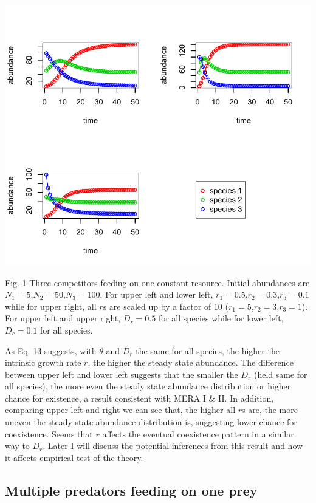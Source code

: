 \documentclass[12pt]{article}
\begin{document}
\includegraphics[width=\textwidth]{integrated_multi_competitors.pdf}
\begin{center}
Fig. 1 Three competitors feeding on one constant resource. Initial abundances are $N_1=5$,$N_2=50$,$N_3=100$. For upper left and lower left, $r_1=0.5$,$r_2=0.3$,$r_3=0.1$ while for upper right, all $r$s are scaled up by a factor of 10 ($r_1=5$,$r_2=3$,$r_3=1$). For upper left and upper right, $D_r=0.5$ for all species while for lower left, $D_r=0.1$ for all species.
\end{center}

As Eq. 13 suggests, with $\theta$ and $D_r$ the same for all species, the higher the intrinsic growth rate $r$, the higher the steady state abundance. The difference between upper left and lower left suggests that the smaller the $D_r$ (held same for all species), the more even the steady state abundance distribution or higher chance for existence, a result consistent with MERA I \& II. In addition, comparing upper left and right we can see that, the higher all $r$s are, the more uneven the steady state abundance distribution is, suggesting lower chance for coexistence. Seems that $r$ affects the eventual coexistence pattern in a similar way to $D_r$. Later I will discuss the potential inferences  from this result and how it affects empirical test of the theory.

\subsection{Multiple predators feeding on one prey}
\end{document}
